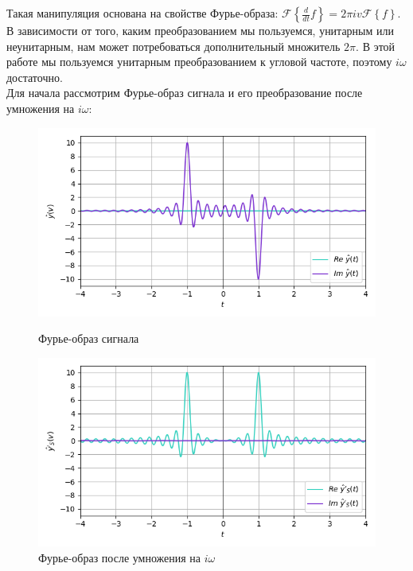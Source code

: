 \documentclass[a4paper]{article}
\begin{document}
Такая манипуляция основана на свойстве Фурье-образа: $\mathcal{F}\left\{ \frac{d}{dt} f \right\} = 2\pi iv\mathcal{F}\left\{ f \right\}$. В зависимости от того, каким преобразованием мы пользуемся, унитарным или неунитарным, нам может потребоваться дополнительный множитель $2\pi$. В этой работе мы пользуемся унитарным преобразованием к угловой частоте, поэтому $i\omega$ достаточно.\\[0.5em]
Для начала рассмотрим Фурье-образ сигнала и его преобразование после умножения на $i\omega$:
\begin{figure}[H]
    \begin{minipage}{0.49\textwidth}
        \centering \includegraphics[width=\textwidth]{sources/first/3_fft.png}
        \caption{Фурье-образ сигнала}
    \end{minipage}\hfill
    \begin{minipage}{0.49\textwidth}
        \centering \includegraphics[width=\textwidth]{sources/first/4_spectral_fft.png}
        \caption{Фурье-образ после умножения на $i\omega$}
    \end{minipage}
\end{figure}
\end{document}
